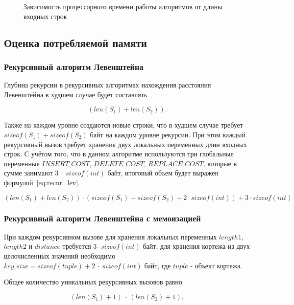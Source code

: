 \begin{figure}[!htb]
    \caption{Зависимость процессорного времени работы алгоритмов от длины входных строк}
    \label{fig:timings}
\end{figure}

\newpage

\subsection{Оценка потребляемой памяти}

\subsubsection{Рекурсивный алгоритм Левенштейна}

Глубина рекурсии в рекурсивных алгоритмах нахождения расстояния Левенштейна в худшем случае будет составлять 

\begin{equation}
    (len(S_1) + len(S_2)).
\end{equation}

Также на каждом уровне создаются новые строки, что в худшем случае требует $sizeof(S_1) + sizeof(S_2)$ байт на каждом уровне рекурсии. При этом каждый рекурсивный вызов требует хранения двух локальных переменных длин входных строк. С учётом того, что в данном алгоритме используются три глобальные переменные $INSERT\_COST$, $DELETE\_COST$, $REPLACE\_COST$, которые в сумме занимают $3~\cdot~sizeof(int)$ байт, итоговый объем будет выражен формулой~\ref{eq:recur_lev}.

\begin{equation}
    \label{eq:recur_lev}
    (len(S_1) + len(S_2)) \cdot (sizeof(S_1) + sizeof(S_2) + 2 \cdot sizeof(int)) + 3 \cdot sizeof(int)
\end{equation}

\subsubsection{Рекурсивный алгоритм Левенштейна с мемоизацией}

При каждом рекурсивном вызове для хранения локальных переменных $length1$, $length2$ и $distance$ требуется $3 \cdot sizeof(int)$ байт, для хранения кортежа из двух целочисленных значений необходимо $key\_size = sizeof(tuple) + 2~\cdot~sizeof(int)$ байт, где $tuple$ - объект кортежа. 

Общее количество уникальных рекурсивных вызовов равно 

\begin{equation}
    \label{eq:recur_calls}
    (len(S_1) + 1)~\cdot~(len(S_2) + 1),
\end{equation}

